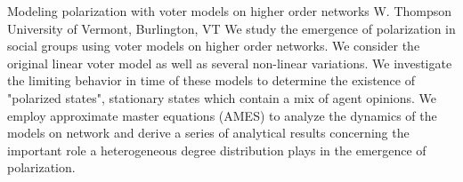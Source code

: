 
    \begin{abstract_online}{Modeling polarization with voter models on higher order networks}{%
        W. Thompson}{%
        }{%
        University of Vermont, Burlington, VT}
    We study the emergence of polarization in social groups using voter models on higher order networks. We consider the original linear voter model as well as several non-linear variations. We investigate the limiting behavior in time of these models to determine the existence of "polarized states", stationary states which contain a mix of agent opinions. We employ approximate master equations (AMES) to analyze the dynamics of the models on network and derive a series of analytical results concerning the important role a heterogeneous degree distribution plays in the emergence of polarization. 
    
    \end{abstract_online}
    